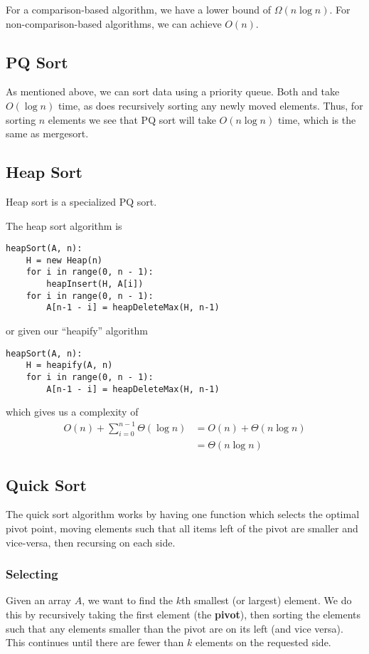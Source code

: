 \documentclass[12pt]{article}
\begin{document}
For a comparison-based algorithm, we have a lower bound of $\Omega(n\log n)$. For non-comparison-based algorithms, we can achieve $O(n)$.

\subsection{PQ Sort}
As mentioned above, we can sort data using a priority queue. Both  and  take $O(\log n)$ time, as does recursively sorting any newly moved elements. Thus, for sorting $n$ elements we see that PQ sort will take $O(n\log n)$ time, which is the same as mergesort.

\subsection{Heap Sort}
Heap sort is a specialized PQ sort.

The heap sort algorithm is
\begin{verbatim}
heapSort(A, n):
    H = new Heap(n)
    for i in range(0, n - 1):
        heapInsert(H, A[i])
    for i in range(0, n - 1):
        A[n-1 - i] = heapDeleteMax(H, n-1)
\end{verbatim}
or given our ``heapify'' algorithm
\begin{verbatim}
heapSort(A, n):
    H = heapify(A, n)
    for i in range(0, n - 1):
        A[n-1 - i] = heapDeleteMax(H, n-1)
\end{verbatim}
which gives us a complexity of
\begin{align*}
O(n) + \sum_{i=0}^{n-1} \Theta(\log n) &= O(n) + \Theta(n\log n)\\
&= \Theta(n\log n)
\end{align*}

\subsection{Quick Sort}
The quick sort algorithm works by having one function which selects the optimal pivot point, moving elements such that all items left of the pivot are smaller and vice-versa, then recursing on each side.

\subsubsection{Selecting}
Given an array $A$, we want to find the $k$th smallest (or largest) element. We do this by recursively taking the first element (the {\bf pivot}), then sorting the elements such that any elements smaller than the pivot are on its left (and vice versa). This continues until there are fewer than $k$ elements on the requested side.
\end{document}
